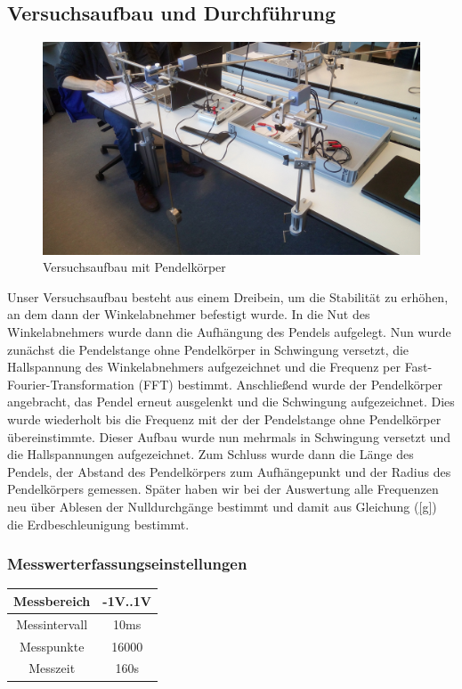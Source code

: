 \documentclass[12pt,a4paper]{article}
\begin{document}
\subsection{Versuchsaufbau und Durchführung}
\begin{figure}[H]
\centering
\includegraphics[scale=0.1]{Bilder/Einzelpendel.jpg}
\caption{Versuchsaufbau mit Pendelkörper}
\end{figure}
Unser Versuchsaufbau besteht aus einem Dreibein, um die Stabilität zu erhöhen, an dem dann der Winkelabnehmer befestigt wurde. \newline
In die Nut des Winkelabnehmers wurde dann die Aufhängung des Pendels aufgelegt.
Nun wurde zunächst die Pendelstange ohne Pendelkörper in Schwingung versetzt, die Hallspannung des Winkelabnehmers aufgezeichnet und die Frequenz per Fast-Fourier-Transformation (FFT) bestimmt. \newline
Anschließend wurde der Pendelkörper angebracht, das Pendel erneut ausgelenkt und die Schwingung aufgezeichnet. 
Dies wurde wiederholt bis die Frequenz mit der der Pendelstange ohne Pendelkörper übereinstimmte.
Dieser Aufbau wurde nun mehrmals in Schwingung versetzt und die Hallspannungen aufgezeichnet.
Zum Schluss wurde dann die Länge des Pendels, der Abstand des Pendelkörpers zum Aufhängepunkt und der Radius des Pendelkörpers gemessen.
\newline
Später haben wir bei der Auswertung alle Frequenzen neu über Ablesen der Nulldurchgänge bestimmt und damit aus Gleichung (\ref{g}) die Erdbeschleunigung bestimmt.
\subsubsection{Messwerterfassungseinstellungen}
\begin{center}
\begin{tabular}{c|c}
Messbereich & -1V..1V \\ 
\hline
Messintervall & 10ms \\ 
\hline
Messpunkte & 16000 \\ 
\hline
Messzeit & 160s \\ 
\end{tabular} 
\end{center}
\newpage
\end{document}
